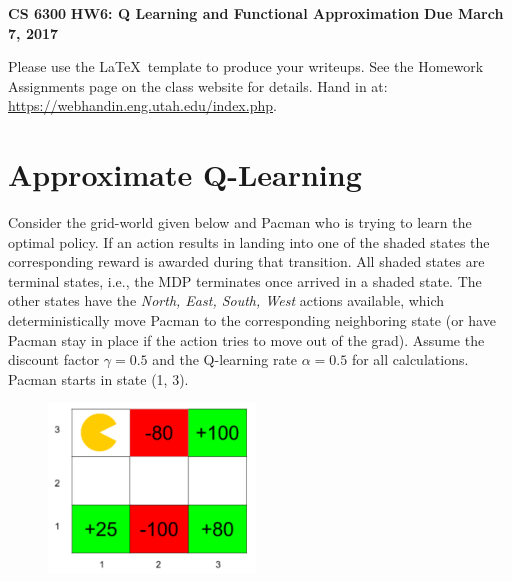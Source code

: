 \documentclass[12pt]{article}
\begin{document}
\begin{center}
{\bf CS 6300} \hfill {\large\bf HW6: Q Learning and Functional Approximation} \hfill {\bf Due March 7, 2017}
\end{center}

\noindent
Please use the \LaTeX\ template to produce your writeups. See the
Homework Assignments page on the class website for details.  Hand in
at: \url{https://webhandin.eng.utah.edu/index.php}.

\section{Approximate Q-Learning}

Consider the grid-world given below and Pacman who is trying to learn
the optimal policy.  If an action results in landing into one of the
shaded states the corresponding reward is awarded during that
transition.  All shaded states are terminal states, i.e., the MDP
terminates once arrived in a shaded state.  The other states have the
\textit{North, East, South, West} actions available, which
deterministically move Pacman to the corresponding neighboring state
(or have Pacman stay in place if the action tries to move out of the
grad).  Assume the discount factor $\gamma = 0.5$ and the Q-learning
rate $\alpha = 0.5$ for all calculations. Pacman starts in state (1,
3).

\begin{figure}[htb!]
\begin{center}
\includegraphics[height=4.5cm]{qlearn.png}
\end{center}
\end{figure}
\end{document}
